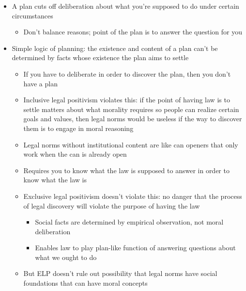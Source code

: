 \begin{itemize}
\tightlist
\item
  A plan cuts off deliberation about what you're supposed to do under
  certain circumstances

  \begin{itemize}
  \tightlist
  \item
    Don't balance reasons; point of the plan is to answer the question
    for you
  \end{itemize}
\item
  Simple logic of planning: the existence and content of a plan can't be
  determined by facts whose existence the plan aims to settle

  \begin{itemize}
  \tightlist
  \item
    If you have to deliberate in order to discover the plan, then you
    don't have a plan
  \item
    Inclusive legal positivism violates this: if the point of having law
    is to settle matters about what morality requires so people can
    realize certain goals and values, then legal norms would be useless
    if the way to discover them is to engage in moral reasoning
  \item
    Legal norms without institutional content are like can openers that
    only work when the can is already open
  \item
    Requires you to know what the law is supposed to answer in order to
    know what the law is
  \item
    Exclusive legal positivism doesn't violate this: no danger that the
    process of legal discovery will violate the purpose of having the
    law

    \begin{itemize}
    \tightlist
    \item
      Social facts are determined by empirical observation, not moral
      deliberation
    \item
      Enables law to play plan-like function of answering questions
      about what we ought to do
    \end{itemize}
  \item
    But ELP doesn't rule out possibility that legal norms have social
    foundations that can have moral concepts


\end{itemize}
\end{itemize}
